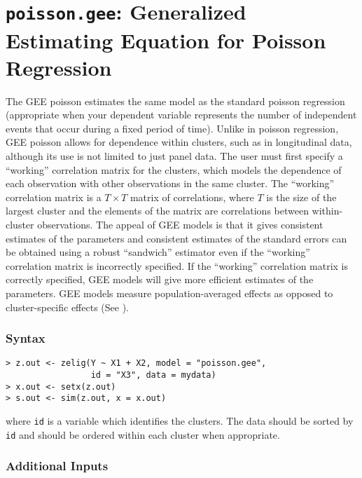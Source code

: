 



\section{\texttt{poisson.gee}: Generalized Estimating Equation for Poisson Regression}
\label{poisson.gee}

The GEE poisson estimates the same model as the standard poisson
regression (appropriate when your dependent variable represents
the number of independent events that occur during a fixed period of time).  Unlike in poisson
regression, GEE poisson allows for dependence within clusters, such as
in longitudinal data, although its use is not limited to just
panel data.  The user must first specify a ``working''
correlation matrix for the clusters, which models the dependence of each observation with other observations in the same cluster.  The ``working'' correlation matrix is a $T \times T$ matrix of correlations, where $T$ is the size of the largest cluster and the elements of the matrix are correlations between within-cluster observations.  The appeal of GEE models is that it gives consistent estimates of the parameters and consistent estimates of
the standard errors can be obtained using a robust ``sandwich''
estimator even if the ``working'' correlation matrix is incorrectly
specified.  If the ``working'' correlation matrix is correctly specified, GEE models will give more efficient estimates of the parameters.  GEE models measure  population-averaged effects as opposed to cluster-specific effects (See \citet{Zorn01}).     

\subsubsection{Syntax}

\begin{verbatim}
> z.out <- zelig(Y ~ X1 + X2, model = "poisson.gee",
                 id = "X3", data = mydata)
> x.out <- setx(z.out)
> s.out <- sim(z.out, x = x.out)
\end{verbatim}

\noindent where \texttt{id} is a variable which identifies the clusters.  The data should be sorted by \texttt{id} and should be ordered within each cluster when appropriate.

\subsubsection{Additional Inputs}

